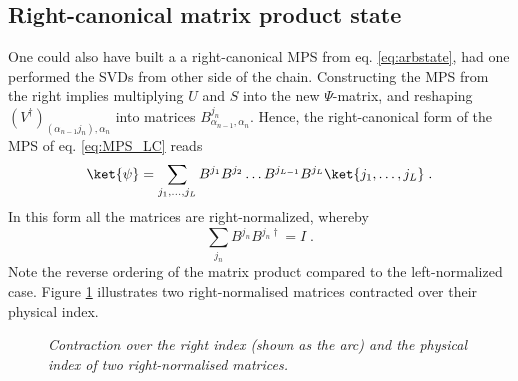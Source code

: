 \subsection{Right-canonical matrix product state}
One could also have built a a right-canonical MPS from eq. \eqref{eq:arbstate}, had one performed the SVDs from other side of the chain. Constructing the MPS from the right implies multiplying $U$ and $S$ into the new $\Psi$-matrix, and reshaping $(V^{\dag})_{(\alpha_{n-1} j_n), \alpha_n}$ into matrices $B_{\alpha_{n-1} , \alpha_n}^{j_n}$. Hence, the right-canonical form of the MPS of eq. \eqref{eq:MPS_LC} reads
\begin{equation}
	\ket{\psi} = \sum_{j_1, \ldots, j_L} B^{j_1} B^{j_2} \ldots B^{j_{L-1}} B^{j_{L}} \ket{j_1, \ldots, j_L} \; .
\label{eq:MPS_RC}	 
\end{equation}
In this form all the matrices are right-normalized, whereby 
\begin{equation}
	\sum_{j_n} B^{j_n} B^{j_n \dag} = I \; .
	\label{eq:RC_ident}
\end{equation}
Note the reverse ordering of the matrix product compared to the left-normalized case. Figure \ref{fig:rightNorm} illustrates two right-normalised matrices contracted over their physical index.
\begin{figure}[h!]
	\centering
	
	\caption{\textit{Contraction over the right index (shown as the arc) and the physical index of two right-normalised matrices.}}
	\label{fig:rightNorm}
\end{figure}


